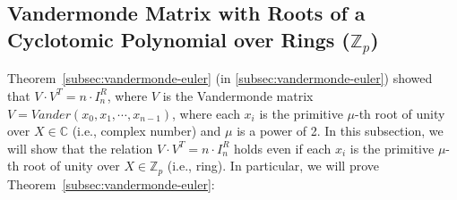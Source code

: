 \subsection{Vandermonde Matrix with Roots of a Cyclotomic Polynomial over Rings ($\mathbb{Z}_p$)}
\label{subsec:vandermonde-euler-integer-ring}

Theorem~\ref*{subsec:vandermonde-euler} (in \autoref{subsec:vandermonde-euler}) showed that $V \cdot V^T = n \cdot I^R_n$, where $V$ is the Vandermonde matrix $V = \mathit{Vander}(x_0, x_1, \cdots, x_{n-1})$, where each $x_i$ is the primitive $\mu$-th root of unity over $X \in \mathbb{C}$ (i.e., complex number) and $\mu$ is a power of 2. In this subsection, we will show that the relation $V \cdot V^T = n \cdot I^R_n$ holds even if each $x_i$ is the primitive $\mu$-th root of unity over $X \in \mathbb{Z}_p$ (i.e., ring). In particular, we will prove Theorem~\ref*{subsec:vandermonde-euler}: 


